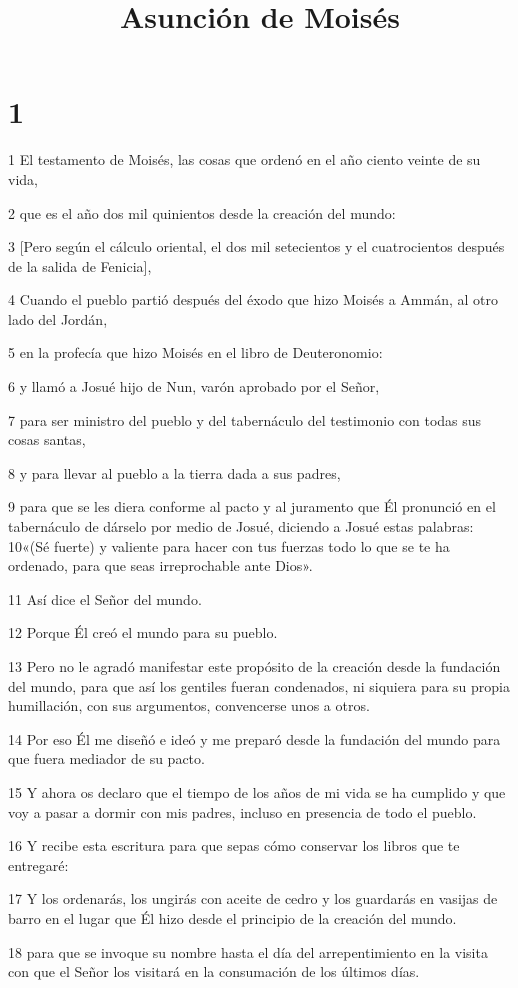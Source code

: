 

\title{Asunción de Moisés}

\chapter{1}

\par 1 El testamento de Moisés, las cosas que ordenó en el año ciento veinte de su vida,
\par 2 que es el año dos mil quinientos desde la creación del mundo:
\par 3 [Pero según el cálculo oriental, el dos mil setecientos y el cuatrocientos después de la salida de Fenicia],
\par 4 Cuando el pueblo partió después del éxodo que hizo Moisés a Ammán, al otro lado del Jordán,
\par 5 en la profecía que hizo Moisés en el libro de Deuteronomio:
\par 6 y llamó a Josué hijo de Nun, varón aprobado por el Señor,
\par 7 para ser ministro del pueblo y del tabernáculo del testimonio con todas sus cosas santas,
\par 8 y para llevar al pueblo a la tierra dada a sus padres,
\par 9 para que se les diera conforme al pacto y al juramento que Él pronunció en el tabernáculo de dárselo por medio de Josué, diciendo a Josué estas palabras:
10«(Sé fuerte) y valiente para hacer con tus fuerzas todo lo que se te ha ordenado, para que seas irreprochable ante Dios».
\par 11 Así dice el Señor del mundo.
\par 12 Porque Él creó el mundo para su pueblo.
\par 13 Pero no le agradó manifestar este propósito de la creación desde la fundación del mundo, para que así los gentiles fueran condenados, ni siquiera para su propia humillación, con sus argumentos, convencerse unos a otros.
\par 14 Por eso Él me diseñó e ideó y me preparó desde la fundación del mundo para que fuera mediador de su pacto.
\par 15 Y ahora os declaro que el tiempo de los años de mi vida se ha cumplido y que voy a pasar a dormir con mis padres, incluso en presencia de todo el pueblo.
\par 16 Y recibe esta escritura para que sepas cómo conservar los libros que te entregaré:
\par 17 Y los ordenarás, los ungirás con aceite de cedro y los guardarás en vasijas de barro en el lugar que Él hizo desde el principio de la creación del mundo.
\par 18 para que se invoque su nombre hasta el día del arrepentimiento en la visita con que el Señor los visitará en la consumación de los últimos días.

